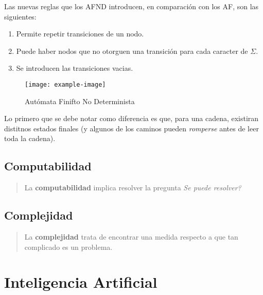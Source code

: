 \documentclass[12pt]{book}
\begin{document}
	\par Las nuevas reglas que los AFND introducen, en comparaci\'on con los AF, son las siguientes:
	\begin{enumerate}
		\item Permite repetir transiciones de un nodo.
		\item Puede haber nodos que no otorguen una transici\'on para cada caracter de $\Sigma$.
		\item Se introducen las transiciones vacias.
	\end{enumerate}
	
	\begin{figure}[htp]
		\centering
			\texttt{[image: example-image]}
		\caption{Aut\'omata Finifto No Determinista}
		\label{fig: AFND}
	\end{figure}
	
	\par Lo primero que se debe notar como diferencia es que, para una cadena, existiran distitnos estados finales (y algunos de los caminos pueden \textit{romperse} antes de leer toda la cadena). 


	
	






\chapter{Computabilidad}
	\begin{quote}
		La \textbf{computabilidad} implica resolver la pregunta \textit{Se puede resolver?}
	\end{quote}
	
\chapter{Complejidad}
	\begin{quote}
		La \textbf{complejidad} trata de encontrar una medida respecto a que tan complicado es un problema.
	\end{quote}


\part{Inteligencia Artificial}
\end{document}
